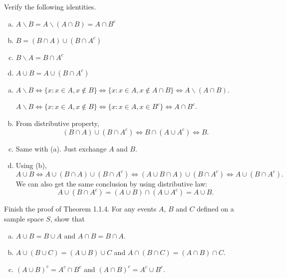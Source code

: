 \documentclass[14pt]{elegantbook}
\begin{document}

\chapter{}

    \setcounter{exer}{1}
    \begin{exercise}
        Verify the following identities. 
        \begin{enumerate}[(a)]
            \item $A\backslash B=A\backslash (A\cap B)=A\cap B^c$
            \item $B=(B\cap A)\cup (B\cap A^c)$
            \item $B\backslash A=B\cap A^c$
            \item $A\cup B=A\cup (B\cap A^c)$
        \end{enumerate}
    \end{exercise}

    \begin{solution}
        \begin{enumerate}[(a)]
            \item $A\backslash B \Leftrightarrow \{x: x\in A, x\notin B\}\Leftrightarrow \{x:x\in A, x\notin A\cap B\}\Leftrightarrow A\backslash (A\cap B)$. 
            
            $A\backslash B \Leftrightarrow \{x: x\in A, x\notin B\}\Leftrightarrow\{x:x\in A, x\in B^c\}\Leftrightarrow A\cap B^c$. 
            \item From distributive property, 
            \[
                (B\cap A)\cup (B\cap A^c) \Leftrightarrow B\cap (A\cup A^c)\Leftrightarrow B. 
            \]
            \item Same with (a). Just exchange $A$ and $B$. 
            \item Using (b), \[
                A\cup B\Leftrightarrow A\cup (B\cap A)\cup (B\cap A^c)\Leftrightarrow (A\cup B\cap A)\cup (B\cap A^c)\Leftrightarrow A\cup (B\cap A^c). 
            \]
            We can also get the same conclusion by using distributive law: 
            \[A\cup(B\cap A^c)=(A\cup B)\cap(A\cup A^c)=A\cup B. \]
        \end{enumerate}
    \end{solution}

    \begin{exercise}
        Finish the proof of Theorem 1.1.4. For any events $A$, $B$ and $C$ defined on a sample space $S$, show that
        \begin{enumerate}[(a)]
            \item $A\cup B=B\cup A$ and $A\cap B=B\cap A$. 
            \item $A\cup (B\cup C)=(A\cup B)\cup C$ and $A\cap (B\cap C)=(A\cap B)\cap C$. 
            \item $(A\cup B)^c=A^c\cap B^c$ and $(A\cap B)^c=A^c\cup B^c$. 
        \end{enumerate}
    \end{exercise}
\end{document}
